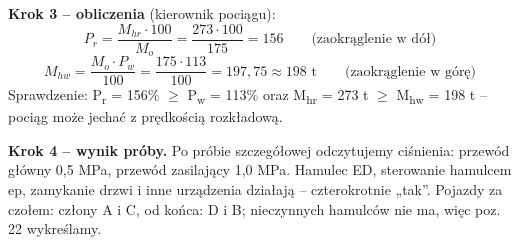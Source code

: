 \textbf{Krok 3 – obliczenia} (kierownik pociągu):
\[ P_r = \frac{M_{hr} \cdot 100}{M_o} = \frac{273 \cdot 100}{175} = 156 \qquad \text{(zaokrąglenie w dół)} \]
\[ M_{hw} = \frac{M_o \cdot P_w}{100} = \frac{175 \cdot 113}{100} = 197{,}75 \approx 198 \text{ t} \qquad \text{(zaokrąglenie w górę)} \]
Sprawdzenie: P\textsubscript{r} = 156\% $\ge$ P\textsubscript{w} = 113\% oraz M\textsubscript{hr} = 273 t $\ge$ M\textsubscript{hw} = 198 t – pociąg może jechać z prędkością rozkładową.

\textbf{Krok 4 – wynik próby.} Po próbie szczegółowej odczytujemy ciśnienia: przewód główny 0,5 MPa, przewód zasilający 1,0 MPa. Hamulec ED, sterowanie hamulcem ep, zamykanie drzwi i inne urządzenia działają – czterokrotnie „tak”. Pojazdy za czołem: człony A i C, od końca: D i B; nieczynnych hamulców nie ma, więc poz. 22 wykreślamy.

